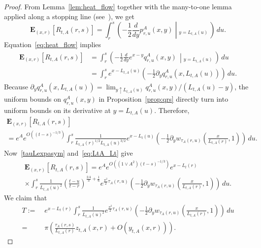 \documentclass[AHL,Unicode,longabstracts,published]{cedram}
\newcommand*\E{\mathbf{E}}
\newcommand{\1} {\mathds{1}}
\begin{document}
\begin{proof}
From Lemma~\ref{lem:heat_flow} together with the many-to-one lemma applied along a stopping line (see~\cite[Sections~3.2 and~3.3]{thesis}), we get
\begin{equation}\label{eq:heat_flow}
\E_{(x,r)}\left[R_{t,A}(r,s)\right] =\int_r^s \left(-\frac 1 2 \frac{d}{dy}p^A_{r,u}(x,y)\middle|_{y=L_{t,A}(u)}\,\right)\,du.
\end{equation}
Equation~\eqref{eq:heat_flow} implies
\begin{align*}
\E_{(x,r)}\left[R_{t,A}(r,s)\right] &=\int_r^s \left(-\frac 1 2 \frac{d}{dy}e^{x-y}q^A_{r,u}(x,y)\,\middle|_{y=L_{t,A}(u)}\,\right)\,du\\
&= \int_r^s e^{x-L_{t,A}(u)}\left(-\frac 1 2 \partial_y q^A_{r,u}\left(x,L_{t,A}(u)\right)\right)\,du.
\end{align*}
Because $\partial_y q^A_{r,u}(x,L_{t,A}(u)) = \lim_{y\uparrow L_{t,A}(u)} q^A_{r,u}(x,y)/(L_{t,A}(u)-y)$, the uniform bounds on $q^A_{r,u}(x,y)$ in Proposition~\ref{prop:qrs} directly turn into uniform bounds on its derivative at $y=L_{t,A}(u)$. Therefore,
\begin{multline*}
\E_{(x,r)}\left[R_{t,A}(r,s)\right] \\
= e^A e^{O\left((t - s)^{-1/3}\right)} \int_r^s \frac{1}{L_{t,A}(r)^{1/2}L_{t,A}(u)^{3/2}} e^{x-L_t(u)} \left(-\frac 1 2 \partial_y w_{\tau_A(r,u)} \left(\frac{x}{L_{t,A}(r)}, 1 \right)\right)\,du.
\end{multline*}
Now~\eqref{tauLexpasym} and~\eqref{eq:LtA_Lt} give
\begin{multline}\label{Rexpeqtoshow1}
\E_{(x,r)}\left[R_{t,A}(r,s)\right] = e^A e^{O\left(\left(1 \vee A^2\right)(t - s)^{-1/3}\right)} e^{x-L_t(r)} \\
\times \int_r^s \frac{1}{L_{t,A}(u)^2} \left(\frac{t-u}{t-r} \right)^{\frac{2A} 3 + \frac 1 6} e^{\frac{\pi^2}2\tau_A(r,u)} \left(-\frac 1 2 \partial_y w_{\tau_A(r,u)} \left(\frac{x}{L_{t,A}(r)}, 1 \right)\right)\,du.
\end{multline}
We claim that
\begin{equation}\label{Rexpeqtoshow}
\begin{split}
T := &\; e^{x-L_t(r)}\int_r^s \frac{1}{L_{t,A}(u)^2} e^{\frac{\pi^2}2\tau_A(r,u)} \left(-\frac 1 2 \partial_y w_{\tau_A(r,u)} \left(\frac{x}{L_{t,A}(r)}, 1 \right)\right)\,du \\
= & \;\pi \left(\frac{\tau_A(r,s)}{L_{t,A}(r)} z_{t,A}(x,r) + O(y_{t,A}(x,r))\right).
\end{split}
\end{equation}

\end{proof}
\end{document}
